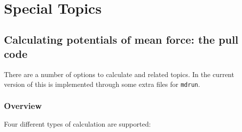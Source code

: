 %
% 
% 
% 
% 
% 
% 
% 
% 
%

\chapter{Special Topics}
\label{ch:special}
\section{Calculating potentials of mean force: the pull code}
\label{sec:pull}
There are a number of options to calculate 
and related topics. In the current version of {\gromacs} this is
implemented through some extra files for {\tt mdrun}. 

\subsection{Overview}
Four different types of calculation are supported:

